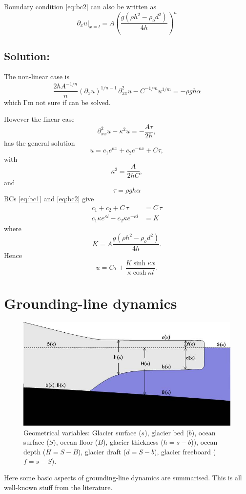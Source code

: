 \documentclass[10pt,a4paper]{book}
\newcommand{\p}{\partial}
\begin{document}
Boundary condition \eqref{eq:bc2} can also be written as
\[
\p_x u |_{x=l} = A \left ( \frac{g (\rho h^2- \rho_o d^2)}{4 h} \right )^n
\]


\section{Solution:}
The non-linear case is
\[
\frac{2 h A^{-1/n}}{n} (\p_x u)^{1/n-1} \, \p^2_{xx} u- C^{-1/m} u^{1/m}  = - \rho g h \alpha
\]
which I'm not sure if can be solved.

However the linear case
\[
\p^2_{xx} u - \kappa^2 u  = - \frac{A \tau}{2 h} ,
\]
has the general solution
\[
u=c_1 e^{\kappa x} + c_2 e^{-\kappa x} + C \tau ,
\]
with
\[
\kappa^2=\frac{A}{2hC} ,
\]
and
\[ \tau=\rho g h \alpha \]
BCs \eqref{eq:bc1} and \eqref{eq:bc2} give
\begin{align*}
c_1 + c_2 + C \, \tau&= C \, \tau \\
c_1 \kappa e^{\kappa l} - c_2 \kappa e^{-\kappa l} &= K
\end{align*}
where
\[
K=A \frac{ g (\rho h^2- \rho_o d^2)}{4 h} .
\]
Hence
\[
u=C \tau +\frac{K \sinh \kappa x}{\kappa \cosh \kappa l}.
\]




\chapter{Grounding-line dynamics}


\begin{figure}
\centerline{\includegraphics[width=12cm]{ProblemGeometry.jpg}}
\caption{Geometrical variables: Glacier surface ($s$), glacier bed ($b$), ocean surface ($S$), ocean floor ($B$), 
glacier thickness ($h=s-b$)), ocean depth ($H=S-B$), glacier draft ($d=S-b$), glacier freeboard ($f=s-S$). 
\label{fig:PG2}}
\end{figure}


Here some basic aspects of grounding-line dynamics are
summarised. This is all well-known stuff from the literature.
\end{document}
